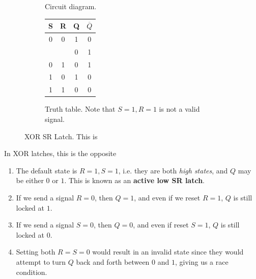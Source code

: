 \begin{definition}[SR Latch]
\begin{figure}[H]
\begin{subfigure}[b]{0.48\textwidth}
        \caption{Circuit diagram.}
      \end{subfigure}
      \hfill 
      \begin{subfigure}[b]{0.48\textwidth}
        \centering
        \begin{tabular}{|c|c|c|c|}
          \hline
          \textbf{S} & \textbf{R} & \textbf{Q} & \textbf{$\overline{Q}$} \\
          \hline
          0 & 0 & 1 & 0 \\
            &   & 0 & 1 \\
          \hline
          0 & 1 & 0 & 1 \\
          \hline
          1 & 0 & 1 & 0 \\
          \hline
          1 & 1 & 0 & 0 \\
          \hline
        \end{tabular} 
        \caption{Truth table. Note that $S=1, R=1$ is not a valid signal.}
      \end{subfigure}
      \caption{XOR SR Latch. This is }
    \end{figure}

    In XOR latches, this is the opposite
    \begin{enumerate}
      \item The default state is $R = 1, S = 1$, i.e. they are both \textit{high states}, and $Q$ may be either $0$ or $1$. This is known as an \textbf{active low SR latch}.
      \item If we send a signal $R = 0$, then $Q = 1$, and even if we reset $R = 1$, $Q$ is still locked at $1$. 
      \item If we send a signal $S = 0$, then $Q = 0$, and even if reset $S = 1$, $Q$ is still locked at $0$. 
      \item Setting both $R = S = 0$ would result in an invalid state since they would attempt to turn $Q$ back and forth between $0$ and $1$, giving us a race condition. 
    \end{enumerate}

    \begin{figure}[H]
      \centering
      \begin{subfigure}[b]{0.48\textwidth}
        \centering
\end{subfigure}
\end{figure}
\end{definition}

